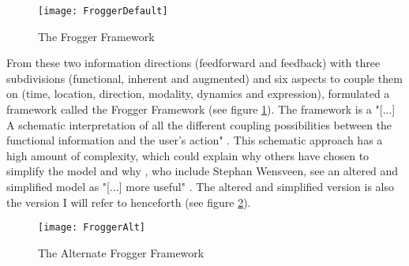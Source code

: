 \begin{figure}[h]
  \texttt{[image: FroggerDefault]}
  \caption{The Frogger Framework}
  \label{frogdef}
\end{figure}

From these two information directions (feedforward and feedback) with three subdivisions (functional, inherent and augmented) and six aspects to couple them on (time, location, direction, modality, dynamics and expression),  formulated a framework called the Frogger Framework (see figure \ref{frogdef}). The framework is a "[...] A schematic interpretation of all the different coupling possibilities between the functional information and the user’s action" \cite[p. 6]{frogger}. This schematic approach has a high amount of complexity, which could explain why others have chosen to simplify the model \cite{tangifrog} and why , who include Stephan Wensveen, see an altered and simplified model as "[...] more useful" \cite[p. 22]{transbehav}. The altered and simplified version is also the version I will refer to henceforth (see figure \ref{frogalt}).

\begin{figure}[h]
  \texttt{[image: FroggerAlt]}
  \caption{The Alternate Frogger Framework}
  \label{frogalt}
\end{figure}

\newpage
